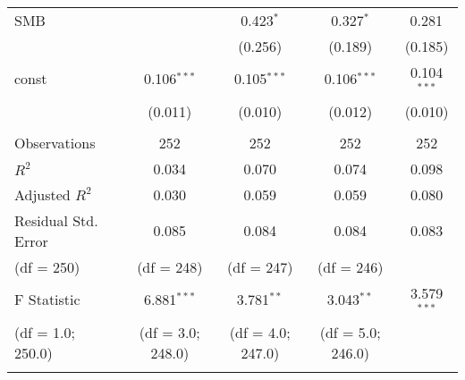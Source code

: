 \begin{table}[H]
\begin{tabular}{@{\extracolsep{5pt}}lcccc}
    SMB                 &                                                                                          & 0.423$^{*}$       & 0.327$^{*}$       & 0.281$^{}$    \\
                        &                                                                                          & (0.256)           & (0.189)           & (0.185)       \\
    const               & 0.106$^{***}$                                                                            & 0.105$^{***}$     & 0.106$^{***}$     & 0.104$^{***}$ \\
                        & (0.011)                                                                                  & (0.010)           & (0.012)           & (0.010)       \\
    \hline                                                                                                                                                                 \\[-1.8ex]
    Observations        & 252                                                                                      & 252               & 252               & 252           \\
    $R^2$               & 0.034                                                                                    & 0.070             & 0.074             & 0.098         \\
    Adjusted $R^2$      & 0.030                                                                                    & 0.059             & 0.059             & 0.080         \\
    Residual Std. Error & 0.085                                                                                    & 0.084             & 0.084             & 0.083         \\
    (df = 250)          & (df = 248)                                                                               & (df = 247)        & (df = 246)                        \\
    F Statistic         & 6.881$^{***}$                                                                            & 3.781$^{**}$      & 3.043$^{**}$      & 3.579$^{***}$ \\
    (df = 1.0; 250.0)   & (df = 3.0; 248.0)                                                                        & (df = 4.0; 247.0) & (df = 5.0; 246.0)                 \\
    \hline
    \hline                                                                                                                                                                 \\[-1.8ex]

\end{tabular}
\end{table}
